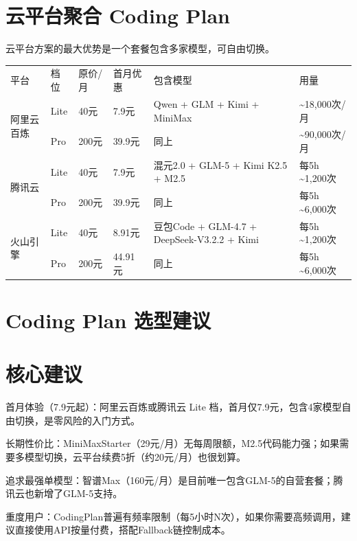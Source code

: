 \documentclass[
  10
]{article}
\newcounter{none} %
\begin{document}
\section{云平台聚合 Coding
Plan}\label{ux4e91ux5e73ux53f0ux805aux5408-coding-plan}

云平台方案的最大优势是一个套餐包含多家模型，可自由切换。

{\def\LTcaptype{none} %
\begin{longtable}[]{@{}llllll@{}}
\toprule\noalign{}
\endhead
\bottomrule\noalign{}
\endlastfoot
平台 & 档位 & 原价/月 & 首月优惠 & 包含模型 & 用量 \\
\multirow{2}{*}{阿里云百炼} & Lite & 40元 & 7.9元 & Qwen + GLM + Kimi +
MiniMax & \textasciitilde18,000次/月 \\
& Pro & 200元 & 39.9元 & 同上 & \textasciitilde90,000次/月 \\
\multirow{2}{*}{腾讯云} & Lite & 40元 & 7.9元 & 混元2.0 + GLM-5 + Kimi
K2.5 + M2.5 & 每5h \textasciitilde1,200次 \\
& Pro & 200元 & 39.9元 & 同上 & 每5h \textasciitilde6,000次 \\
\multirow{2}{*}{火山引擎} & Lite & 40元 & 8.91元 & 豆包Code + GLM-4.7 +
DeepSeek-V3.2.2 + Kimi & 每5h \textasciitilde1,200次 \\
& Pro & 200元 & 44.91元 & 同上 & 每5h \textasciitilde6,000次 \\
\end{longtable}
}

\section{Coding Plan
选型建议}\label{coding-plan-ux9009ux578bux5efaux8bae}

\section{核心建议}\label{ux6838ux5fc3ux5efaux8bae-19}

首月体验（7.9元起）：阿里云百炼或腾讯云 Lite
档，首月仅7.9元，包含4家模型自由切换，是零风险的入门方式。

长期性价比：MiniMaxStarter（29元/月）无每周限额，M2.5代码能力强；如果需要多模型切换，云平台续费5折（约20元/月）也很划算。

追求最强单模型：智谱Max（160元/月）是目前唯一包含GLM-5的自营套餐；腾讯云也新增了GLM-5支持。

重度用户：CodingPlan普遍有频率限制（每5小时N次），如果你需要高频调用，建议直接使用API按量付费，搭配Fallback链控制成本。
\end{document}

